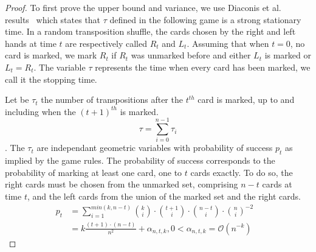 \documentclass[english,oneside,twocolumn]{article}
\begin{document}
\begin{proof}
To first prove the upper bound and variance, we use Diaconis et al. results~\cite{aldous1986shuffling} which states that $\tau$ defined in the following game is a strong stationary time.
In a random transposition shuffle, the cards chosen by the right and left hands at time $t$ are respectively called $R_t$ and $L_t$. Assuming that when $t=0$, no card is marked, we mark $R_t$ if
$R_t$ was unmarked before and either $L_t$ is marked or $L_t = R_t$. The variable $\tau$ represents the time when every card has been marked, we call it the stopping time.

Let be $\tau_t$ the number of transpositions after the $t^{th}$ card is marked, up to and including when the $(t+1)^{th}$ is marked. $$\tau = \sum_{i=0}^{n-1} \tau_i$$.
The $\tau_t$ are independant geometric variables with probability of success $p_t$ as implied by the game rules.
The probability of success corresponds to the probability of marking at least one card, one to $t$ cards exactly. To do so, the right cards must be chosen from the unmarked set, comprising $n-t$ cards at time $t$,
and the left cards from the union of the marked set and the right cards.
\begin{align*}
 p_t &= \sum_{i=1}^{min(k,n-t)} {k \choose i} \cdot {t+1 \choose i} \cdot {n-t \choose i}\cdot{n \choose i}^{-2}&\\
 &= k \frac{(t+1)\cdot(n-t)}{n^2} + \alpha_{n,t,k}, 0 < \alpha_{n,t,k} = \mathcal{O}\left(n^{-k}\right )
\end{align*}


\end{proof}
\end{document}
